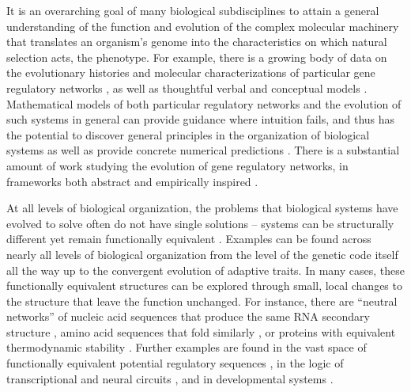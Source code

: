 \documentclass{article}
\newcommand{\plr}[1]{\todo[color=blue!25]{#1}}
\newcommand{\plr}[1]{{\color{blue}\it #1}}
\newcommand{\jss}[1]{{\color{olive}\it #1}}
\newcommand{\1}{\mathbbm{1}}
\begin{document}
It is an overarching goal of many biological subdisciplines 
to attain a general understanding of the function and evolution of the 
complex molecular machinery that translates an organism's genome 
into the characteristics on which natural selection acts,
the phenotype.
For example, 
there is a growing body of data on the evolutionary histories and molecular characterizations of particular gene regulatory networks
\citep{jaeger2011gap, davidson2006gene, israel2016comparative}, 
as well as thoughtful verbal and conceptual models \citep{true2001developmental, weiss2000phenogenetic, edelman2001degeneracy, pavlicev2012model}. 
Mathematical models of both particular regulatory networks
and the evolution of such systems in general
can provide guidance where intuition fails,
and thus has the potential to discover general principles in the organization of biological systems 
as well as provide concrete numerical predictions \citep{servedio2014not}.
There is a substantial amount of work studying the evolution of gene regulatory networks, in frameworks 
both abstract \citep{wagner1994evolution, wagner1996does, siegal2002waddington, bergman2003evolutionary, draghi2015robustness}
and empirically inspired
\citep{mjolsness1991connectionist, jaeger2004dynamic, vitaly1, crombach2016gap, wotton2015quantitative, chertkova2017insilico}.

At all levels of biological organization,
the problems that biological systems have evolved to solve
often do not have single solutions --
systems can be structurally different yet remain functionally equivalent \citep{edelman2001degeneracy}. 
Examples can be found across nearly all levels of biological organization from the level of the genetic code itself %
all the way up to the convergent evolution of adaptive traits.
In many cases, these functionally equivalent structures
can be explored through small, local changes to the structure that leave the function unchanged.
For instance, there are ``neutral networks''
of nucleic acid sequences that produce the same RNA secondary structure \citep{gruner1996analysis},
amino acid sequences that fold similarly \citep{babajide1997neutral},
or proteins with equivalent thermodynamic stability \citep{hart2014thermodynamic}.
Further examples are found in the vast space of functionally equivalent
potential regulatory sequences \citep{hare2008sepsid}, 
in the logic of transcriptional \citep{tsong2006evolution, matsui2015regulatory, dalal2016transcriptional, dalal2017transcription} 
and neural circuits \citep{trojanowski2014neural}, and in developmental systems \citep{true2001developmental}. 
 
\end{document}
